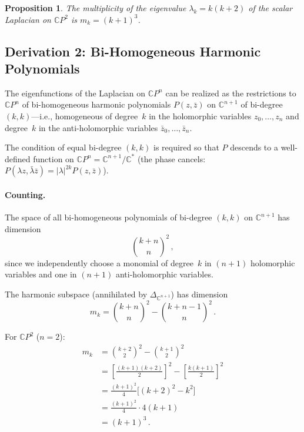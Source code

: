 \documentclass[11pt]{article}
\newtheorem{proposition}{Proposition}
\theoremstyle{remark}
\begin{document}
\begin{proposition}
The multiplicity of the eigenvalue $\lambda_k = k(k+2)$ of the scalar
Laplacian on $\mathbb{C}P^2$ is $m_k = (k+1)^3$.
\end{proposition}

\subsection{Derivation 2: Bi-Homogeneous Harmonic Polynomials}

The eigenfunctions of the Laplacian on $\mathbb{C}P^n$ can be realized as the
restrictions to $\mathbb{C}P^n$ of bi-homogeneous harmonic polynomials
$P(z, \bar{z})$ on $\mathbb{C}^{n+1}$ of bi-degree $(k,k)$---i.e.,
homogeneous of degree~$k$ in the holomorphic variables $z_0, \ldots, z_n$
and degree~$k$ in the anti-holomorphic variables
$\bar{z}_0, \ldots, \bar{z}_n$.

The condition of equal bi-degree $(k,k)$ is required so that $P$ descends
to a well-defined function on $\mathbb{C}P^n = \mathbb{C}^{n+1}\!/\mathbb{C}^*$
(the phase cancels: $P(\lambda z, \bar{\lambda}\bar{z})
= |\lambda|^{2k} P(z,\bar{z})$).

\paragraph{Counting.}
The space of all bi-homogeneous polynomials of bi-degree $(k,k)$ on
$\mathbb{C}^{n+1}$ has dimension
\begin{equation}
\binom{k+n}{n}^{\!2}\,,
\end{equation}
since we independently choose a monomial of degree~$k$ in $(n{+}1)$
holomorphic variables and one in $(n{+}1)$ anti-holomorphic variables.

The harmonic subspace (annihilated by $\Delta_{\mathbb{C}^{n+1}}$)
has dimension
\begin{equation}
m_k = \binom{k+n}{n}^{\!2} - \binom{k+n-1}{n}^{\!2}\,.
\end{equation}

For $\mathbb{C}P^2$ ($n = 2$):
\begin{align}
m_k &= \binom{k+2}{2}^{\!2} - \binom{k+1}{2}^{\!2} \\
    &= \left[\frac{(k+1)(k+2)}{2}\right]^{\!2}
     - \left[\frac{k(k+1)}{2}\right]^{\!2} \\
    &= \frac{(k+1)^2}{4}\bigl[(k+2)^2 - k^2\bigr] \\
    &= \frac{(k+1)^2}{4}\cdot 4(k+1) \\
    &= (k+1)^3\,.
\end{align}
\end{document}

